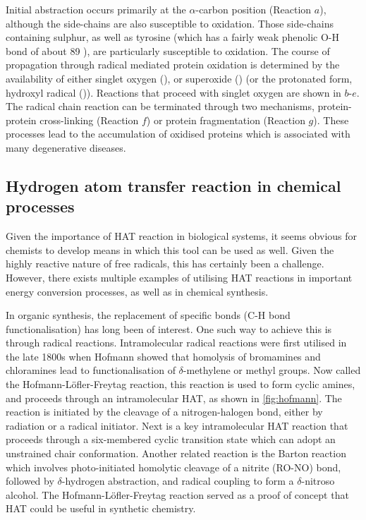 Initial abstraction occurs primarily at the $\alpha$-carbon position (Reaction
$a$), although the side-chains are also susceptible to oxidation.  Those
side-chains containing sulphur,\cite{Stadtman2004} as well as tyrosine (which has
a fairly weak phenolic O-H bond of about 89 \kcalmol),\cite{Mulder2005} are
particularly susceptible to oxidation. The course of propagation through radical
mediated protein oxidation is determined by the availability of either singlet
oxygen (), or superoxide () (or the protonated form,
hydroxyl radical ()). Reactions that proceed with singlet oxygen are
shown in $b$-$e$. The radical chain reaction can be terminated through two
mechanisms, protein-protein cross-linking (Reaction $f$) or protein
fragmentation (Reaction $g$). These processes lead to the accumulation of
oxidised proteins which is associated with many degenerative
diseases.\cite{Halliwell2006}


\subsection{Hydrogen atom transfer reaction in chemical processes}

Given the importance of HAT reaction in biological systems, it seems obvious for
chemists to develop means in which this tool can be used as well. Given the
highly reactive nature of free radicals, this has certainly been a challenge.
However, there exists multiple examples of utilising HAT reactions in important
energy conversion processes,\cite{Hammes-Schiffer2012} as well as in chemical
synthesis.\cite{Balcells2016,Miller2016}

In organic synthesis, the replacement of specific  bonds (C-H bond
functionalisation) has long been of interest. One such way to achieve this is
through radical reactions.\cite{Godula2006} Intramolecular radical reactions
were first utilised in the late 1800s when Hofmann showed that homolysis of
bromamines and chloramines lead to functionalisation of $\delta$-methylene or
methyl groups. Now called the
Hofmann-L{\"o}fler-Freytag reaction, this reaction is used to form cyclic
amines, and proceeds through an intramolecular HAT, as shown in
\ref{fig:hofmann}. The reaction is initiated by the cleavage of a
nitrogen-halogen bond, either by radiation or a radical initiator. Next is a key
intramolecular HAT reaction that proceeds through a six-membered cyclic
transition state which can adopt an unstrained chair conformation.  Another
related reaction is the Barton reaction\cite{Barton1960} which involves
photo-initiated homolytic cleavage of a nitrite (RO-NO) bond, followed by
$\delta$-hydrogen abstraction, and radical coupling to form a $\delta$-nitroso
alcohol. The Hofmann-L{\"o}fler-Freytag reaction served as a proof of concept
that HAT could be useful in synthetic chemistry.

